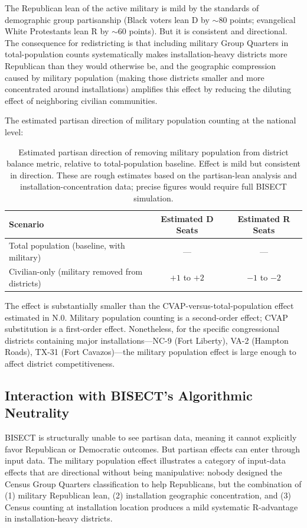 The Republican lean of the active military is mild by the standards of demographic group partisanship (Black voters lean D by $\sim$80 points; evangelical White Protestants lean R by $\sim$60 points). But it is consistent and directional. The consequence for redistricting is that including military Group Quarters in total-population counts systematically makes installation-heavy districts more Republican than they would otherwise be, and the geographic compression caused by military population (making those districts smaller and more concentrated around installations) amplifies this effect by reducing the diluting effect of neighboring civilian communities.

The estimated partisan direction of military population counting at the national level:

\begin{table}[h]
\centering
\begin{tabular}{lcc}
\toprule
\textbf{Scenario} & \textbf{Estimated D Seats} & \textbf{Estimated R Seats} \\
\midrule
Total population (baseline, with military) & --- & --- \\
Civilian-only (military removed from districts) & $+1$ to $+2$ & $-1$ to $-2$ \\
\bottomrule
\end{tabular}
\caption{Estimated partisan direction of removing military population from district balance metric, relative to total-population baseline. Effect is mild but consistent in direction. These are rough estimates based on the partisan-lean analysis and installation-concentration data; precise figures would require full BISECT simulation.}
\label{tab:military-partisan}
\end{table}

The effect is substantially smaller than the CVAP-versus-total-population effect estimated in N.0. Military population counting is a second-order effect; CVAP substitution is a first-order effect. Nonetheless, for the specific congressional districts containing major installations---NC-9 (Fort Liberty), VA-2 (Hampton Roads), TX-31 (Fort Cavazos)---the military population effect is large enough to affect district competitiveness.

\subsection{Interaction with BISECT's Algorithmic Neutrality}

BISECT is structurally unable to see partisan data, meaning it cannot explicitly favor Republican or Democratic outcomes. But partisan effects can enter through input data. The military population effect illustrates a category of input-data effects that are directional without being manipulative: nobody designed the Census Group Quarters classification to help Republicans, but the combination of (1) military Republican lean, (2) installation geographic concentration, and (3) Census counting at installation location produces a mild systematic R-advantage in installation-heavy districts.

